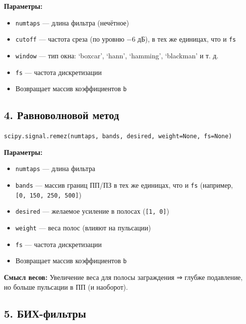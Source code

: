 \documentclass[12pt,a4paper,openany]{book}
\providecommand{\tightlist}{\setlength{\itemsep}{0pt}\setlength{\parskip}{0pt}}
\begin{document}
\textbf{Параметры:}

\begin{itemize}
\tightlist
\item
  \texttt{numtaps} --- длина фильтра (нечётное)
\item
  \texttt{cutoff} --- частота среза (по уровню \(-6\) дБ), в тех же единицах, что и \texttt{fs}
\item
  \texttt{window} --- тип окна: `boxcar', `hann', `hamming', `blackman' и т. д.
\item
  \texttt{fs} --- частота дискретизации
\item
  Возвращает массив коэффициентов \texttt{b}
\end{itemize}

\subsection*{4. Равноволновой метод}

\texttt{scipy.\allowbreak{}signal.\allowbreak{}remez(\allowbreak{}numtaps,\allowbreak{}\ bands,\allowbreak{}\ desired,\allowbreak{}\ weight=\allowbreak{}None,\allowbreak{}\ fs=\allowbreak{}None)}

\textbf{Параметры:}

\begin{itemize}
\tightlist
\item
  \texttt{numtaps} --- длина фильтра
\item
  \texttt{bands} --- массив границ ПП/ПЗ в тех же единицах, что и \texttt{fs} (например, \texttt{{[}0,\allowbreak{}\ 150,\allowbreak{}\ 250,\allowbreak{}\ 500{]}})
\item
  \texttt{desired} --- желаемое усиление в полосах (\texttt{{[}1,\allowbreak{}\ 0{]}})
\item
  \texttt{weight} --- веса полос (влияют на пульсации)
\item
  \texttt{fs} --- частота дискретизации
\item
  Возвращает массив коэффициентов \texttt{b}
\end{itemize}

\textbf{Смысл весов:}
Увеличение веса для полосы заграждения ⇒ глубже подавление, но больше пульсации в ПП (и наоборот).

\subsection*{5. БИХ-фильтры}
\end{document}
